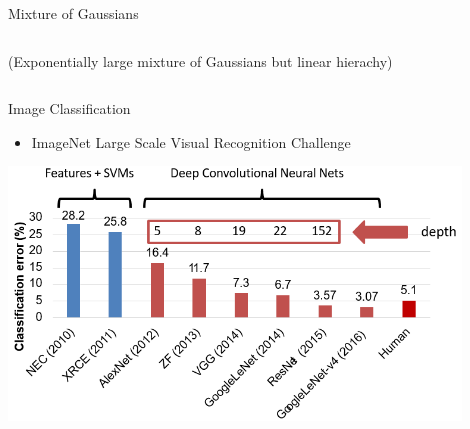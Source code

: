 \documentclass[11pt,table]{beamer}
\begin{document}
\begin{frame}{Mixture of Gaussians}
\begin{columns}[T]
\begin{column}{0.5\textwidth}
{(Exponentially large mixture of Gaussians but linear hierachy)
}
\end{column}
\end{columns}
    
\end{frame}

\begin{frame}{Image Classification}
    \begin{itemize}
        \item ImageNet Large Scale Visual Recognition Challenge
 
    \end{itemize}
    \vspace{3mm}
\begin{center}
    \includegraphics[width=0.9\textwidth]{figures/12.PNG}
\end{center}

\end{frame}
\end{document}
